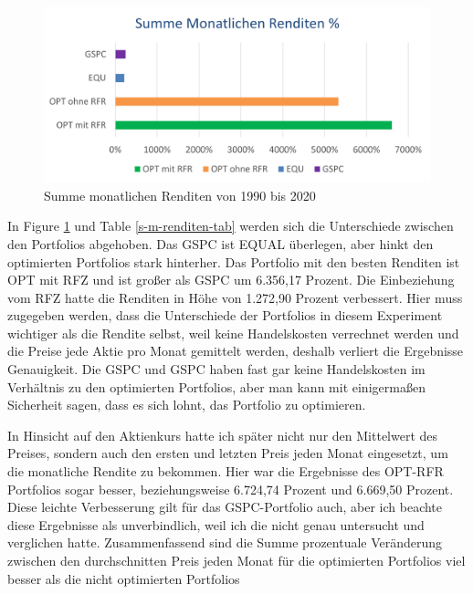 \documentclass[12pt]{article}
\begin{document}
            \begin{figure}[ht]
            
                \begin{center}

                    \includegraphics[scale=0.8]{summe-monatlichen-renditen-1990-2020.png}
                    \caption{Summe monatlichen Renditen von 1990 bis 2020}
                    \label{s-m-renditen-fig}
        
                \end{center}
                
            \end{figure}


            In Figure \ref{s-m-renditen-fig} und Table \ref{s-m-renditen-tab} werden sich die Unterschiede zwischen den Portfolios abgehoben. 
            Das GSPC ist EQUAL überlegen, aber hinkt den optimierten Portfolios stark hinterher. 
            Das Portfolio mit den besten Renditen ist OPT mit RFZ und ist großer als GSPC um 6.356,17 Prozent. 
            Die Einbeziehung vom RFZ hatte die Renditen in Höhe von 1.272,90 Prozent verbessert. 
            Hier muss zugegeben werden, dass die Unterschiede der Portfolios in diesem Experiment wichtiger als die Rendite selbst, 
            weil keine Handelskosten verrechnet werden und die Preise jede Aktie pro Monat gemittelt werden, 
            deshalb verliert die Ergebnisse Genauigkeit. Die GSPC und 
            GSPC haben fast gar keine Handelskosten im Verhältnis zu den optimierten Portfolios, 
            aber man kann mit einigermaßen Sicherheit sagen, dass es sich lohnt, das Portfolio zu optimieren. 

            In Hinsicht auf den Aktienkurs hatte ich später nicht nur den Mittelwert des Preises, 
            sondern auch den ersten und letzten Preis jeden Monat eingesetzt, um die monatliche Rendite zu bekommen. 
            Hier war die Ergebnisse des OPT-RFR Portfolios sogar besser, beziehungsweise 6.724,74 Prozent und 6.669,50 Prozent. 
            Diese leichte Verbesserung gilt für das GSPC-Portfolio auch, aber ich beachte diese Ergebnisse als unverbindlich, 
            weil ich die nicht genau untersucht und verglichen hatte. 
            Zusammenfassend sind die Summe prozentuale Veränderung zwischen den durchschnitten Preis jeden Monat für 
            die optimierten Portfolios viel besser als die nicht optimierten Portfolios
\end{document}
